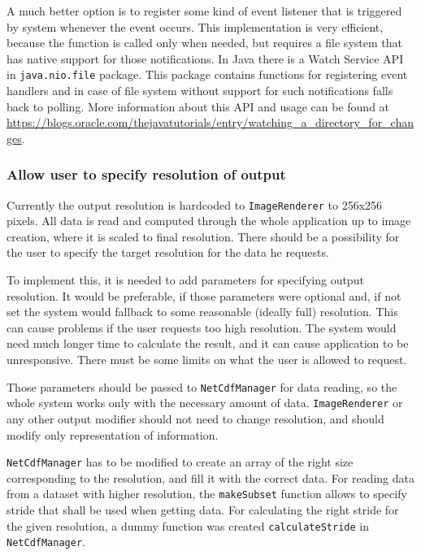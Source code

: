 \documentclass[11pt,a4paper,titlepage,oneside]{report}
\begin{document}
A much better option is to register some kind of event listener that is triggered by system whenever the event occurs. This implementation is very efficient, because the function is called only when needed, but requires a file system that has native support for those notifications. In Java there is a Watch Service API in \texttt{java.nio.file} package. This package contains functions for registering event handlers and in case of file system without support for such notifications falls back to polling. More information about this API and usage can be found at \url{https://blogs.oracle.com/thejavatutorials/entry/watching_a_directory_for_changes}.

\subsubsection{Allow user to specify resolution of output}
Currently the output resolution is hardcoded to \texttt{ImageRenderer} to 256x256 pixels. All data is read and computed through the whole application up to image creation, where it is scaled to final resolution. There should be a possibility for the user to specify the target resolution for the data he requests.

To implement this, it is needed to add parameters for specifying output resolution. It would be preferable, if those parameters were optional and, if not set the system would fallback to some reasonable (ideally full) resolution. This can cause problems if the user requests too high resolution. The system would need much longer time to calculate the result, and it can cause application to be unresponsive. There must be some limits on what the user is allowed to request.

Those parameters should be passed to \texttt{NetCdfManager} for data reading, so the whole system works only with the necessary amount of data. \texttt{ImageRenderer} or any other output modifier  should not need to change resolution, and should modify only representation of information.

\texttt{NetCdfManager} has to be modified to create an array of the right size corresponding to the resolution, and fill it with the correct data. For reading data from a dataset with higher resolution, the \texttt{makeSubset} function allows to specify stride that shall be used when getting data. For calculating the right stride for the given resolution, a dummy function was created \texttt{calculateStride} in \texttt{NetCdfManager}.
\end{document}
